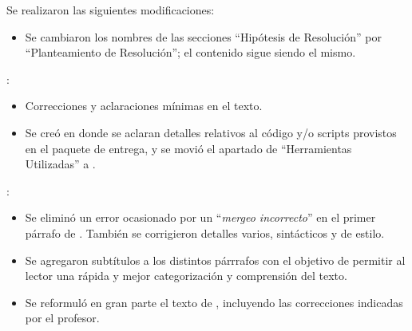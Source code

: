 \documentclass[11pt, a4paper, twoside]{article}
\begin{document}
{}

Se realizaron las siguientes modificaciones:

\begin{itemize}
\item Se cambiaron los nombres de las secciones ``Hipótesis de Resolución''
por ``Planteamiento de Resolución''; el contenido sigue siendo el mismo.
\end{itemize}

:
\begin{itemize}[leftmargin=+4em]
  \item Correcciones y aclaraciones mínimas en el texto.
    
    \item Se creó 
    en donde se aclaran detalles relativos al código 
    y/o scripts provistos en el paquete de entrega, 
    y se movió el apartado de ``Herramientas Utilizadas'' 
    a .
\end{itemize}

:
\begin{itemize}[leftmargin=+4em]

    \item Se eliminó un error ocasionado por un ``\textit{mergeo incorrecto}'' 
    en el primer párrafo de .
    También se corrigieron detalles varios, sintácticos y de estilo.
    
    \item Se agregaron subtítulos a los distintos párrrafos con el
    objetivo de permitir al lector una rápida y mejor
    categorización y comprensión del texto.
    
    \item Se reformuló en gran parte el texto de ,
    incluyendo las correcciones indicadas por el profesor.
    
\end{itemize}

\end{document}
